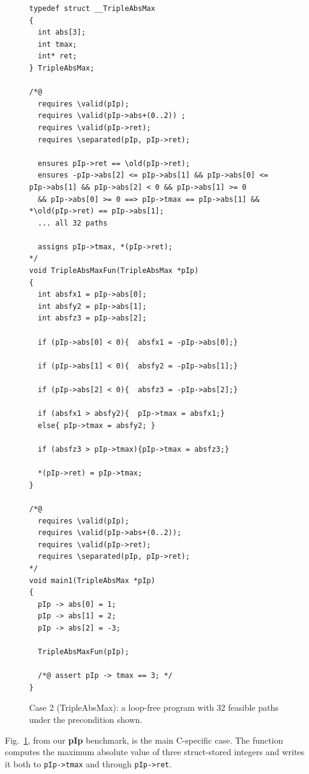 \begin{figure}[!t]
    \centering
    \begin{tcolorbox}[casebox, title={\textcolor{white}{Case 2: path-complete postconditions for pointer-manipulating code}}, width=\linewidth]
\begin{lstlisting}[style=casecompactinnerstyle]
typedef struct __TripleAbsMax
{
  int abs[3];
  int tmax;
  int* ret;
} TripleAbsMax;

/*@
  requires \valid(pIp);
  requires \valid(pIp->abs+(0..2)) ;
  requires \valid(pIp->ret);
  requires \separated(pIp, pIp->ret);

  ensures pIp->ret == \old(pIp->ret);
  ensures -pIp->abs[2] <= pIp->abs[1] && pIp->abs[0] <= pIp->abs[1] && pIp->abs[2] < 0 && pIp->abs[1] >= 0
  && pIp->abs[0] >= 0 ==> pIp->tmax == pIp->abs[1] && *\old(pIp->ret) == pIp->abs[1];
  ... all 32 paths

  assigns pIp->tmax, *(pIp->ret);
*/
void TripleAbsMaxFun(TripleAbsMax *pIp)
{
  int absfx1 = pIp->abs[0];
  int absfy2 = pIp->abs[1];
  int absfz3 = pIp->abs[2];

  if (pIp->abs[0] < 0){  absfx1 = -pIp->abs[0];}

  if (pIp->abs[1] < 0){  absfy2 = -pIp->abs[1];}

  if (pIp->abs[2] < 0){  absfz3 = -pIp->abs[2];}

  if (absfx1 > absfy2){  pIp->tmax = absfx1;}
  else{ pIp->tmax = absfy2; }

  if (absfz3 > pIp->tmax){pIp->tmax = absfz3;}

  *(pIp->ret) = pIp->tmax;
}

/*@
  requires \valid(pIp);
  requires \valid(pIp->abs+(0..2));
  requires \valid(pIp->ret);
  requires \separated(pIp, pIp->ret);
*/
void main1(TripleAbsMax *pIp)
{
  pIp -> abs[0] = 1;
  pIp -> abs[1] = 2;
  pIp -> abs[2] = -3;

  TripleAbsMaxFun(pIp);

  /*@ assert pIp -> tmax == 3; */
}
\end{lstlisting}
    \end{tcolorbox}
    \caption{Case 2 (TripleAbsMax): {a loop-free program with 32 feasible paths under the precondition shown.}}
    \label{fig:case3}
\end{figure}

Fig.~\ref{fig:case3}, from our \textbf{pIp} benchmark, is the main C-specific case. The function computes the maximum absolute value of three struct-stored integers and writes it both to \texttt{pIp->tmax} and through \texttt{pIp->ret}.

